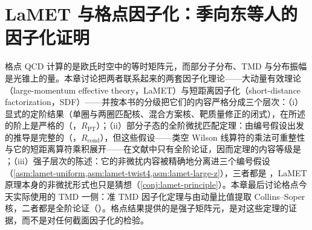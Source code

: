 \chapter{LaMET 与格点因子化：季向东等人的因子化证明}\label{ch:lamet}

格点 QCD 计算的是欧氏时空中的等时矩阵元，而部分子分布、TMD 与分布振幅是光锥上的量。本章讨论把两者联系起来的两套因子化理论——大动量有效理论（large-momentum effective theory，LaMET）与短距离因子化（short-distance factorization，SDF）——并按本书的分级把它们的内容严格分成三个层次：（i）显式的定阶结果（单圈与两圈匹配核、混合方案核、靶质量修正的闭式），在所述的阶上是严格的（\tagR，$R_{\mathrm{PT}}$）；（ii）部分子态的全阶微扰匹配定理：由编号假设出发的推导是完整的（\tagR，$R_{\mathrm{cond}}$），但这些假设——类空 Wilson 线算符的乘法可重整性与它的短距离算符乘积展开——在文献中只有全阶论证，因而定理的内容等级是 \tagA；（iii）强子层次的陈述：它的非微扰内容被精确地分离进三个编号假设（\cref{asm:lamet-uniform,asm:lamet-twist4,asm:lamet-large-z}），三者都是 \tagC，LaMET 原理本身的非微扰形式也只是猜想（\cref{conj:lamet-principle}）。本章最后讨论格点今天实际使用的 TMD 一侧：准 TMD 因子化定理与由动量比值提取 Collins--Soper 核，二者都是全阶论证（\tagA）。格点结果提供的是强子矩阵元，是对这些定理的证据，而不是对任何截面因子化的检验。

